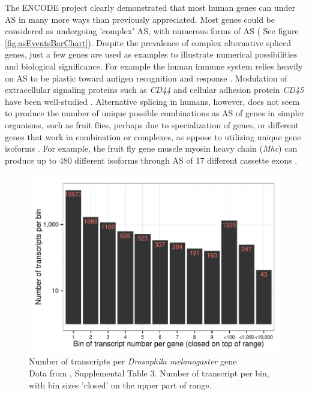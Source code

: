 The ENCODE project clearly demonstrated that most human genes can under AS in many more ways than previously appreciated. Most genes could be considered as undergoing 'complex' AS, with numerous forms of AS ( See figure \ref{fig:asEventsBarChart}). Despite the prevalence of complex alternative spliced genes, just a few genes are used as examples to illustrate numerical possibilities and biological significance. For example the human immune system relies heavily on AS to be plastic toward antigen recognition and response \citep{Lynch2004}. Modulation of extracellular signaling proteins such as \textit{CD44} and cellular adhesion protein \textit{CD45} have been well-studied \citep{Zikherman2008,Ponta2003b}. Alternative splicing in humans, however, does not seem to produce the number of unique possible combinations as AS of genes in simpler organisms, such as fruit flies, perhaps due to specialization of genes, or different genes that work in combination or complexes, as oppose to utilizing unique gene isoforms \citep{Park2007}. For example, the fruit fly gene muscle myosin heavy chain (\textit{Mhc}) can produce up to 480 different isoforms through AS of 17 different cassette exons \citep{Bernstein1983a}.  

\begin{figure}[htbp]
	\centering 
	\includegraphics{Figures/NumberOFTranscriptsPerFlyGene.pdf}
	\caption[Number of transcripts per \textit{Drosophila melanogaster} gene]
	{
		Number of transcripts per \textit{Drosophila melanogaster} gene\\[0.25cm]
		Data from \citep{Brown2014}, Supplemental Table 3. Number of transcript per bin, with bin sizes 'closed' on the upper part of range.
	}
	\label{fig:txPerFlyGene}
\end{figure}

